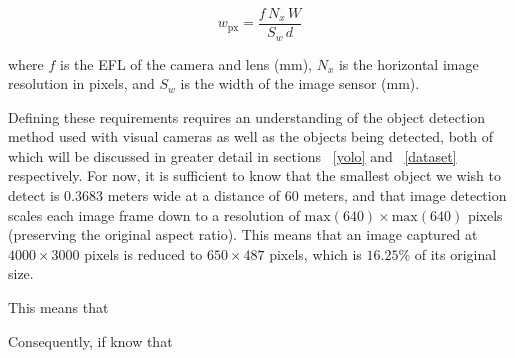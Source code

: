 \documentclass{erauthesis}
\begin{document}
  \begin{equation}
  w_{\text{px}} = \frac{f \, N_x \, W}{S_w \, d}
  \end{equation}

where $f$ is the \ac{EFL} of the camera and lens (mm), $N_x$ is the horizontal image resolution in pixels, and $S_w$ is the width of the image sensor (mm). 




Defining these requirements requires an understanding of the object detection method used with visual cameras as well as the objects being detected, both of which will be discussed in greater detail in sections ~\ref{yolo} and ~\ref{dataset} respectively.
For now, it is sufficient to know that the smallest object we wish to detect is $0.3683$ meters wide at a distance of 60 meters, and that image detection scales each image frame down to a resolution of $\text{max}(640) \times \text{max}(640)$ pixels (preserving the original aspect ratio).
This means that an image captured at $4000 \times 3000$ pixels is reduced to $650 \times 487$ pixels, which is $16.25\%$ of its original size. 

This means that 

Consequently, if know that 

\end{document}
